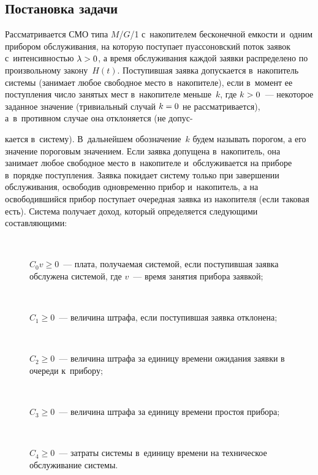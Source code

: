 \begin{multicols}{2}
\vspace*{-6pt}
  
\section{Постановка задачи}

\vspace*{-2pt}

  Рассматривается СМО типа $M$/$G$/1 с~накопителем бесконечной емкости и~одним прибором обслуживания, на которую поступает пуассоновский поток 
заявок с~интенсивностью $\lambda\hm>0$, а время обслуживания каждой заявки 
распределено по произвольному закону~$H(t)$. Поступившая заявка 
допускается в~накопитель системы (занимает любое свободное место 
в~накопителе), если в~момент ее поступления число занятых мест в~накопителе 
меньше~$k$, где $k\hm>0$~---  некоторое заданное значение (тривиальный 
случай $k\hm=0$ не рассматривается), а~в~противном случае она отклоняется 
(не допус-\linebreak\vspace*{-12pt}

\pagebreak

\noindent
кается в~систему). В~дальнейшем обозначение~$k$ будем называть 
порогом, а его значение пороговым значением. Если заявка допущена 
в~накопитель, она занимает любое свободное место в~накопителе 
и~обслуживается на приборе в~порядке поступления. Заявка покидает систему 
только при завершении обслуживания, освободив одновременно прибор 
и~накопитель, а на освободившийся прибор поступает очередная заявка из 
накопителя (если таковая есть). Система получает доход, который определяется 
следующими составляющими:
  \begin{description}  
\item[\,]   $C_0 v\geq 0$~--- плата, получаемая системой, если поступившая заявка 
обслужена системой, где $v$~--- время занятия прибора заявкой; 
\item[\,]  $C_1\geq 0$~--- величина штрафа, если поступившая заявка отклонена;
\item[\,]   
  $C_2\geq 0$~--- величина штрафа за единицу времени ожидания заявки в~
очереди к~прибору;
  \item[\,] 
  $C_3\geq 0$~--- величина штрафа за единицу времени простоя прибора;
  \item[\,] 
  $C_4\geq 0$~--- затраты системы в~единицу времени на техническое 
обслуживание системы. 
  \end{description}
  

\end{multicols}
